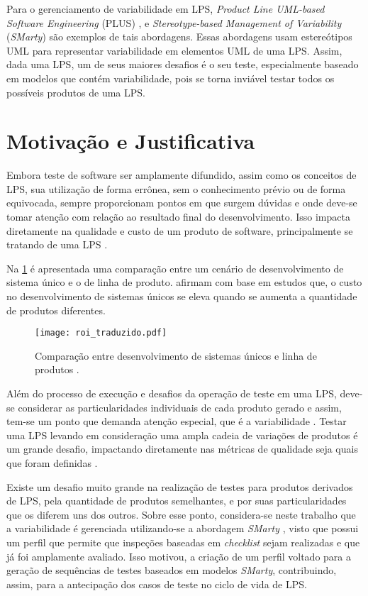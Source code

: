 Para o gerenciamento de variabilidade em LPS, \textit{Product Line UML-based Software Engineering} (PLUS) \cite{gomaa2006designing}, \cite{ziadi2003towards} e \textit{Stereotype-based Management of Variability} (\textit{SMarty}) \cite{junior2010systematic} são exemplos de tais abordagens. Essas abordagens usam estereótipos UML para representar variabilidade em elementos UML de uma LPS. Assim, dada uma LPS, um de seus maiores desafios é o seu teste, especialmente baseado em modelos que contém variabilidade, pois se torna inviável testar todos os possíveis produtos de uma LPS.

\section{Motivação e Justificativa}
\label{cap1sec:motivacao}

Embora teste de software ser amplamente difundido, assim como os conceitos de LPS, sua utilização de forma errônea, sem o conhecimento prévio ou de forma equivocada, sempre proporcionam pontos em que surgem dúvidas e onde deve-se tomar atenção com relação ao resultado final do desenvolvimento. Isso impacta diretamente na qualidade e custo de um produto de software, principalmente se tratando de uma LPS \cite{Weiss:1999:SPE:317887}. 

Na \ref{fig:roi} é apresentada uma comparação entre um cenário de desenvolvimento de sistema único e o de linha de produto. \citet{Weiss:1999:SPE:317887} afirmam com base em estudos que, o custo no desenvolvimento de sistemas únicos se eleva quando se aumenta a quantidade de produtos diferentes.


\begin{figure}[h]
	\centering
	\texttt{[image: roi\_traduzido.pdf]}
	\caption{Comparação entre desenvolvimento de sistemas únicos e linha de produtos \cite{Weiss:1999:SPE:317887}.}
	\label{fig:roi}
\end{figure}


Além do processo de execução e desafios da operação de teste em uma LPS, deve-se considerar as particularidades individuais de cada produto gerado e assim, tem-se um ponto que demanda atenção especial, que é a variabilidade \cite{engstrom2011software}. Testar uma LPS levando em consideração uma ampla cadeia de variações de produtos é um grande desafio, impactando diretamente nas métricas de qualidade seja quais que foram definidas \cite{junior2013systematic}. 

Existe um desafio muito grande na realização de testes para produtos derivados de LPS, pela quantidade de produtos semelhantes, e por suas particularidades que os diferem uns dos outros. Sobre esse ponto, considera-se neste trabalho que a variabilidade é gerenciada utilizando-se a abordagem \textit{SMarty} \cite{junior2010systematic}, visto que possui um perfil que permite que inspeções baseadas em \textit{checklist} sejam realizadas e que já foi amplamente avaliado. Isso motivou, a criação de um perfil voltado para a geração de sequências de testes baseados em modelos \textit{SMarty}, contribuindo, assim, para a antecipação dos casos de teste no ciclo de vida de LPS.

